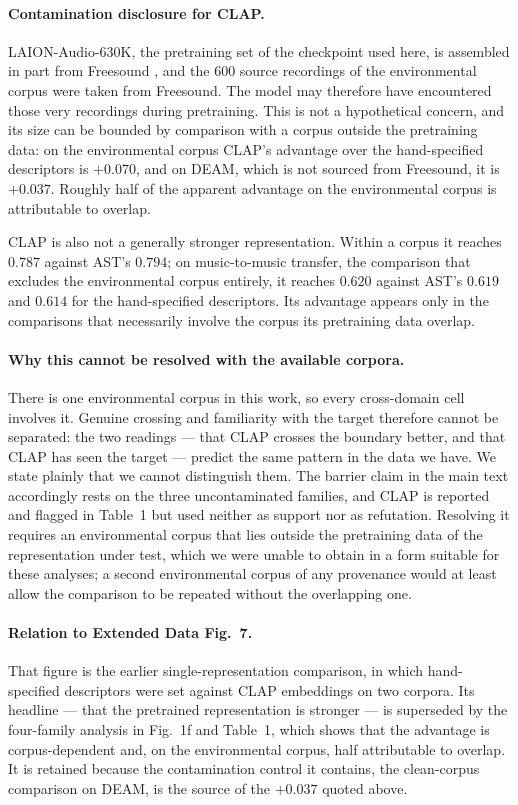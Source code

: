 \paragraph{Contamination disclosure for CLAP.}
LAION-Audio-630K, the pretraining set of the checkpoint used here, is assembled
in part from Freesound \cite{wu2023clap}, and the 600 source recordings of the
environmental corpus were taken from Freesound. The model may therefore have
encountered those very recordings during pretraining. This is not a hypothetical
concern, and its size can be bounded by comparison with a corpus outside the
pretraining data: on the environmental corpus CLAP's advantage over the hand-specified
descriptors is $+0.070$, and on DEAM, which is not sourced from Freesound, it is
$+0.037$. Roughly half of the apparent advantage on the environmental corpus is
attributable to overlap.

CLAP is also not a generally stronger representation. Within a corpus it reaches
$0.787$ against AST's $0.794$; on music-to-music transfer, the comparison that excludes
the environmental corpus entirely, it reaches $0.620$ against AST's $0.619$ and
$0.614$ for the hand-specified descriptors. Its advantage appears only in the
comparisons that necessarily involve the corpus its pretraining data overlap.

\paragraph{Why this cannot be resolved with the available corpora.}
There is one environmental corpus in this work, so every cross-domain cell involves it.
Genuine crossing and familiarity with the target therefore cannot be separated: the two
readings --- that CLAP crosses the boundary better, and that CLAP has seen the target
--- predict the same pattern in the data we have. We state plainly that we cannot
distinguish them. The barrier claim in the main text accordingly rests on the three
uncontaminated families, and CLAP is reported and flagged in Table~1 but used neither
as support nor as refutation. Resolving it requires an environmental corpus that lies
outside the pretraining data of the representation under test, which we were unable to
obtain in a form suitable for these analyses; a second environmental corpus of any
provenance would at least allow the comparison to be repeated without the overlapping
one.

\paragraph{Relation to Extended Data Fig.~7.}
That figure is the earlier single-representation comparison, in which hand-specified
descriptors were set against CLAP embeddings on two corpora. Its headline --- that the
pretrained representation is stronger --- is superseded by the four-family analysis in
Fig.~1f and Table~1, which shows that the advantage is corpus-dependent and, on the
environmental corpus, half attributable to overlap. It is retained because the
contamination control it contains, the clean-corpus comparison on DEAM, is the source
of the $+0.037$ quoted above.

